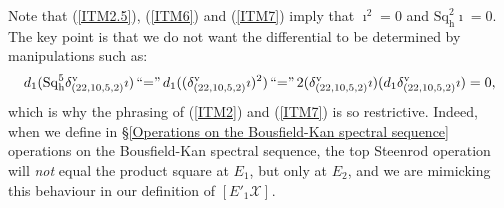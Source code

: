 \documentclass[11pt]{amsart} \renewcommand{\baselinestretch}{1.2}
\theoremstyle{plain}
\numberwithin{equation}{section} %
\theoremstyle{plain}
\numberwithin{equation}{chapter} %
\newcommand{\scrC}{\mathscr{C}}
\newcommand{\calx}{\mathcal{X}}
\newcommand{\CommOperad}{{\scrC}}
\newcommand{\minDimP}{\overline{m}}
\newcommand{\excess}{e}
\newcommand{\Sq}{\mathrm{Sq}}
\newcommand{\Eprime}[5]{[E'_{#2}#3]^{#4}_{#5}}
\newcommand{\uver}{^\mathrm{v}}
\newcommand{\dhor}{_\mathrm{h}}
\newcommand{\Sqh}{\mathrm{Sq}\dhor}
\newcommand{\deltav}{\delta\uver}
\begin{document}
\begin{Calculations of HWn}
Note that (\ref{ITM2.5}), (\ref{ITM6}) and (\ref{ITM7}) imply that $\imath^2=0$ and $\Sqh^{2}\imath=0$.
The key point is that we do not want the differential to be determined by manipulations such as:
\[d_1(\Sqh^5\deltav_{(22,10,5,2)}\imath)\,\textup{``$=$''}\,d_1((\deltav_{(22,10,5,2)}\imath)^{2})\,\textup{``$=$''}\,
2(\deltav_{(22,10,5,2)}\imath)(d_1\deltav_{(22,10,5,2)}\imath)
=0,\]
which is why the phrasing of (\ref{ITM2}) and (\ref{ITM7}) is so restrictive.
Indeed, when we define in \S\ref{Operations on the Bousfield-Kan spectral sequence} operations on the Bousfield-Kan spectral sequence,  the top Steenrod operation will \emph{not} equal the product square at $E_1$, but only at $E_2$, and we are mimicking  this behaviour in our definition of $\Eprime{blank}{1}{\calx}{}{}$.


\end{Calculations of HWn}
\end{document}
